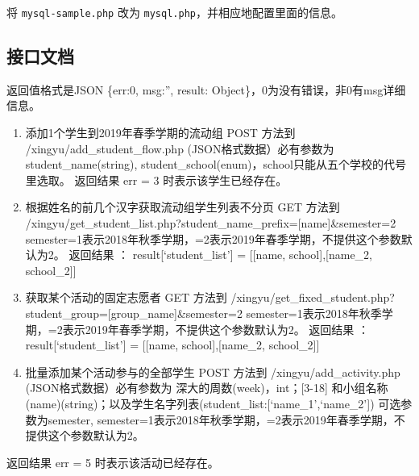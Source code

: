 \documentclass[]{ctexart}
\begin{document}
将 \texttt{mysql-sample.php} 改为
\texttt{mysql.php}，并相应地配置里面的信息。

\subsection{接口文档}\label{ux63a5ux53e3ux6587ux6863}

返回值格式是JSON \{err:0, msg:'', result:
Object\}，0为没有错误，非0有msg详细信息。

\begin{enumerate}
\def\labelenumi{\arabic{enumi}.}
\item
  添加1个学生到2019年春季学期的流动组 POST 方法到
  /xingyu/add\_student\_flow.php (JSON格式数据）必有参数为
  student\_name(string),
  student\_school(enum)，school只能从五个学校的代号里选取。 返回结果 err
  = 3 时表示该学生已经存在。
\item
  根据姓名的前几个汉字获取流动组学生列表不分页 GET 方法到
  /xingyu/get\_student\_list.php?student\_name\_prefix={[}name{]}\&semester=2
  semester=1表示2018年秋季学期，=2表示2019年春季学期，不提供这个参数默认为2。
  返回结果 ： result{[}`student\_list'{]} = {[}{[}name,
  school{]},{[}name\_2, school\_2{]}{]}
\item
  获取某个活动的固定志愿者 GET 方法到
  /xingyu/get\_fixed\_student.php?student\_group={[}group\_name{]}\&semester=2
  semester=1表示2018年秋季学期，=2表示2019年春季学期，不提供这个参数默认为2。
  返回结果 ： result{[}`student\_list'{]} = {[}{[}name,
  school{]},{[}name\_2, school\_2{]}{]}
\item
  批量添加某个活动参与的全部学生 POST 方法到 /xingyu/add\_activity.php
  (JSON格式数据）必有参数为 深大的周数(week)，int；{[}3-18{]}
  和小组名称(name)(string)；以及学生名字列表(student\_list:{[}`name\_1',`name\_2'{]})
  可选参数为semester,
  semester=1表示2018年秋季学期，=2表示2019年春季学期，不提供这个参数默认为2。
\end{enumerate}

返回结果 err = 5 时表示该活动已经存在。
\end{document}
